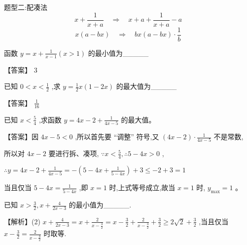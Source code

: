 \documentclass[11pt,a4paper]{article}
\begin{document}
\clearpage
\begin{tcolorbox} 
    \centering
    题型二:配凑法
    \tcblower %
    $$x+\frac{1}{x+a} \quad \Rightarrow \quad x+a+\frac{1}{x+a}-a$$
    $$x(a-bx) \quad \Rightarrow \quad bx(a-bx)\cdot \frac{1}{b} $$
    \end{tcolorbox}
\begin{problem} 
函数 \(\displaystyle y = x + \frac{1}{x - 1}\left( {x > 1}\right)\) 的最小值为\_\_\_\_\_
\begin{jiexi}
【答案】 3


\end{jiexi}
\end{problem}
\begin{problem} 
已知 \(\displaystyle 0 < x < \frac{1}{2}\) ,求 \(\displaystyle y = \frac{1}{2}x\left( {1 - {2x}}\right)\) 的最大值为\_\_\_\_\_
\begin{jiexi}
【答案】 \(\displaystyle \frac{1}{16}\)


\end{jiexi}
\end{problem}
\begin{problem} 
已知 \(\displaystyle x < \frac{5}{4}\) ,求函数 \(\displaystyle y = {4x} - 2 + \frac{1}{{4x} - 5}\) 的最大值。
\begin{jiexi}[25]
【答案】因 \(\displaystyle {4x} - 5 < 0\) ,所以首先要 “调整” 符号,又 \(\displaystyle \left( {{4x} - 2}\right)  \cdot  \frac{1}{{4x} - 5}\) 不是常数,

所以对 \(\displaystyle {4x} - 2\) 要进行拆、凑项, \(\displaystyle \because x < \frac{5}{4},\therefore 5 - {4x} > 0\) ,

\(\displaystyle \therefore y = {4x} - 2 + \frac{1}{{4x} - 5} =  - \left( {5 - {4x} + \frac{1}{5 - {4x}}}\right)  + 3 \leq   - 2 + 3 = 1\)

当且仅当 \(\displaystyle 5 - {4x} = \frac{1}{5 - {4x}}\) ,即 \(\displaystyle x = 1\) 时,上式等号成立,故当 \(\displaystyle x = 1\) 时, \(\displaystyle {y}_{\max } = 1\) 。


\end{jiexi}
\end{problem}
\begin{problem} 
已知 \(\displaystyle x > \frac{3}{2},x + \frac{4}{{2x} - 3}\) 的最小值为\_\_\_\_\_.
\begin{jiexi}
【解析】(2) \(\displaystyle x + \frac{4}{{2x} - 3} = x + \frac{2}{x - \frac{3}{2}} = x - \frac{3}{2} + \frac{2}{x - \frac{3}{2}} + \frac{3}{2} \geq  2\sqrt{2} + \frac{3}{2}\) ,当且仅当 \(\displaystyle x - \frac{3}{2} = \frac{2}{x - \frac{3}{2}}\) 时取等.


\end{jiexi}
\end{problem}
\end{document}
